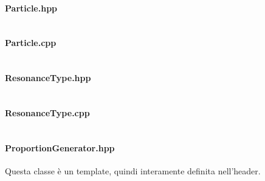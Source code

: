 \documentclass[12pt, a4paper]{article}
\begin{document}
\paragraph{Particle.hpp}
\begin{verbatim}

\end{verbatim}

\paragraph{Particle.cpp}
\begin{verbatim}

\end{verbatim}

\paragraph{ResonanceType.hpp}

\begin{verbatim}

\end{verbatim}

\paragraph{ResonanceType.cpp}
\begin{verbatim}

\end{verbatim}

\paragraph{ProportionGenerator.hpp}
Questa classe è un template, quindi interamente definita nell'header.
\end{document}
